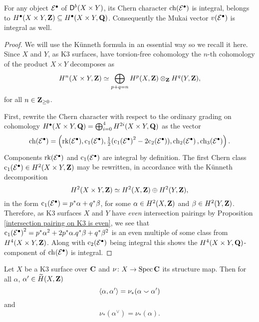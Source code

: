 \begin{lemma}
    \label{Mukai vector is integral}
    For any object $\mathcal E^\bullet$ of $\mathsf{D}^b(X \times Y)$, its Chern character $\ch{\E^\bullet}$ is integral, \ie belongs to $H^\bullet(X \times Y, \mathbf Z) \subseteq H^\bullet(X \times Y, \mathbf Q)$. Consequently the Mukai vector $v(\mathcal E^\bullet)$ is integral as well.
\end{lemma}

\begin{proof}
    We will use the Künneth formula in an essential way so we recall it here. Since $X$ and $Y$, as K3 surfaces, have torsion-free cohomology the $n$-th cohomology of the product $X \times Y$ decomposes as
    \[
        H^n(X \times Y, \mathbf Z) \simeq \bigoplus_{p+q = n} H^p(X, \mathbf Z) \otimes_\mathbf Z H^q(Y, \mathbf Z),
    \] 
    for all $n \in \mathbf Z_{\geq 0}$.
    
    First, rewrite the Chern character with respect to the ordinary grading on cohomology $H^\bullet(X \times Y, \mathbf Q) = \bigoplus_{i=0}^4 H^{2i}(X \times Y, \mathbf Q)$ as the vector
    \[
        \ch{\E^\bullet} = \left(\rk{\E^\bullet}, \cclass[1](\E^\bullet), \tfrac{1}{2}(\cclass[1]{\E^\bullet}^2 - 2\cclass[2]{\E^\bullet}), \ch[2]{\E^\bullet}, \ch[3]{\E^\bullet} \right).
    \]
    Components $\operatorname{rk}(\mathcal E^\bullet)$ and $\cclass[1]{\E^\bullet}$ are integral by definition. The first Chern class $\cclass[1]{\E^\bullet} \in H^2(X\times Y, \Z)$ may be rewritten, in accordance with the Künneth decomposition
    \[
        H^2(X\times Y, \mathbf Z) \simeq H^2(X, \mathbf Z) \oplus H^2(Y, \mathbf Z),
    \]
    in the form $\cclass[1]{\E^\bullet} = p^*\alpha + q^*\beta$, for some $\alpha \in H^2(X, \mathbf Z)$ and $\beta \in H^2(Y, \mathbf Z)$. Therefore, as K3 surfaces $X$ and $Y$ have \emph{even} intersection pairings by Proposition \ref{intersection pairing on K3 is even}, we see that $\cclass[1]{\E^\bullet}^2 = p^*\alpha^2 + 2 p^*\alpha.q^*\beta + q^*\beta^2$ is an even multiple of some class from $H^{4}(X \times Y, \mathbf Z)$. Along with $\cclass[2]{\E^\bullet}$ being integral this shows the $H^4(X \times Y, \mathbf Q)$-component of $\ch[](\E^\bullet)$ is integral.

\end{proof}

\begin{lemma}
    \label{Intersection pairing through push-forward of structure map}
    Let $X$ be a K3 surface over $\mathbf C$ and $\nu \colon X \to \operatorname{Spec}\mathbf C$ its structure map. Then for all $\alpha$, $\alpha' \in \widetilde{H}(X, \mathbf Z)$
    \[
        \langle \alpha, \alpha' \rangle = \nu_*(\alpha \smallsmile \alpha')
    \] 
    and 
    \[
        \nu_*(\alpha^\vee) = \nu_*(\alpha). 
    \]
\end{lemma}

